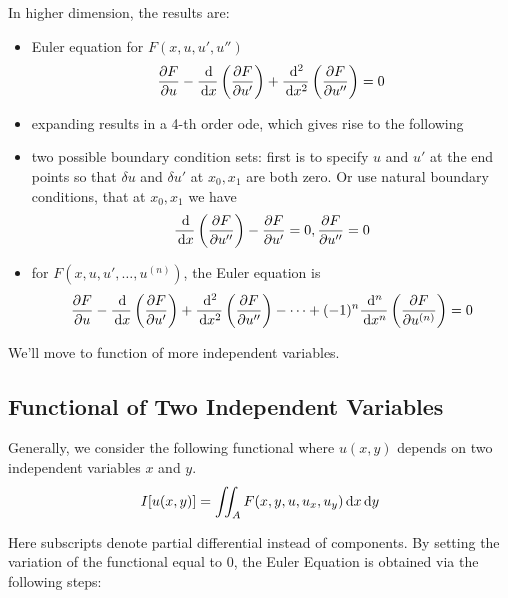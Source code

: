 \documentclass{article}
\begin{document}
In higher dimension, the results are:

\begin{itemize}
    \item Euler equation for \(F(x,u,u',u'')\)
    \[\frac{\partial F}{\partial u}-\frac{\,\mathrm{d} }{\,\mathrm{d} x}\left( \frac{\partial F}{\partial u'} \right)+\frac{\,\mathrm{d}^2 }{\,\mathrm{d} x^2}\left( \frac{\partial F}{\partial u''} \right)=0\]
    \item expanding results in a 4-th order ode, which gives rise to the following
    \item two possible boundary condition sets: first is to specify \(u\) and \(u'\) at the end points so that \(\delta u\) and \(\delta u'\) at \(x_0,x_1\) are both zero. Or use natural boundary conditions, that at \(x_0,x_1\) we have
    \[\frac{\,\mathrm{d} }{\,\mathrm{d} x}\left( \frac{\partial F}{\partial u''} \right)-\frac{\partial F}{\partial u'}=0, \frac{\partial F}{\partial u''}=0\]
    \item for \(F(x,u,u',\dots,u^{(n)})\), the Euler equation is
    \[\frac{\partial F}{\partial u}-\frac{\,\mathrm{d} }{\,\mathrm{d} x}\left( \frac{\partial F}{\partial u'} \right)+\frac{\,\mathrm{d}^2 }{\,\mathrm{d} x^2}\left( \frac{\partial F}{\partial u''} \right)-\cdots+(-1)^n \frac{\,\mathrm{d}^n }{\,\mathrm{d} x^n}\left( \frac{\partial F}{\partial u^{(n)}} \right) =0\]
\end{itemize}

We'll move to function of more independent variables. 
\subsection{Functional of Two Independent Variables}

Generally, we consider the following functional where \(u(x,y)\) depends on two independent variables \(x\) and \(y\).
\[I[u(x,y)] = \iint_A F(x,y,u,u_x,u_y)\,\mathrm{d} x\,\mathrm{d} y\]

Here subscripts denote partial differential instead of components. By setting the variation of the functional equal to \(0\), the Euler Equation is obtained via the following steps:
\end{document}
